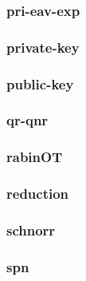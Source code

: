 \begin{frame}\frametitle{pri-eav-exp}
\begin{figure}
\begin{center}

\end{center}
\end{figure}
\end{frame}
\begin{frame}\frametitle{private-key}
\begin{figure}
\begin{center}

\end{center}
\end{figure}
\end{frame}
\begin{frame}\frametitle{public-key}
\begin{figure}
\begin{center}

\end{center}
\end{figure}
\end{frame}
\begin{frame}\frametitle{qr-qnr}
\begin{figure}
\begin{center}

\end{center}
\end{figure}
\end{frame}
\begin{frame}\frametitle{rabinOT}
\begin{figure}
\begin{center}

\end{center}
\end{figure}
\end{frame}
\begin{frame}\frametitle{reduction}
\begin{figure}
\begin{center}

\end{center}
\end{figure}
\end{frame}
\begin{frame}\frametitle{schnorr}
\begin{figure}
\begin{center}

\end{center}
\end{figure}
\end{frame}
\begin{frame}\frametitle{spn}
\begin{figure}
\begin{center}

\end{center}
\end{figure}
\end{frame}
